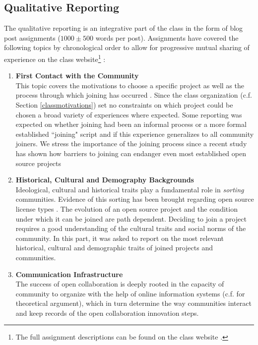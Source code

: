 \subsection{Qualitative Reporting}
\label{qualitative_reporting}
The qualitative reporting is an integrative part of the class in the form of blog post assignments ($1000\pm500$ words per post). Assignments have covered the following topics by chronological order to allow for progressive mutual sharing of experience on the class website\footnote{The full assignment descriptions can be found on the class website \cite{classweb2013}.} :

\begin{enumerate}
  \item {\bf First Contact with the Community} \\ 
This topic covers the motivations to choose a specific project as well as the process through which joining has occurred \cite{lakhani2005htu,robert2006,vonKrogh2012}. Since the class organization (c.f. Section \ref{classmotivations}) set no constraints on which project could be chosen a broad variety of experiences where expected. Some reporting was expected on whether joining had been an informal process or a more formal established ``joining" script \cite{vonKrogh2003} and if this experience generalizes to all community joiners. We stress the importance of the joining process since a recent study has shown how barriers to joining can endanger even most established open source projects \cite{halfaker2013} \\

  \item {\bf Historical, Cultural and Demography Backgrounds} \\
Ideological, cultural and historical traits play a fundamental role in {\it sorting} communities. Evidence of this sorting has been brought regarding open source license types \cite{belenzon2009}. The evolution of an open source project and the condition under which it can be joined are path dependent. Deciding to join a project requires a good understanding of the cultural traits and social norms of the community. In this part, it was asked to report on the most relevant historical, cultural and demographic traits of joined projects and communities. \\


 \item{\bf Communication Infrastructure}\\
The success of open collaboration is deeply rooted in the capacity of community to organize with the help of online information systems (c.f. \cite{benkler2002} for theoretical argument), which in turn determine the way communities interact and keep records of the open collaboration innovation steps. \\


\end{enumerate}

